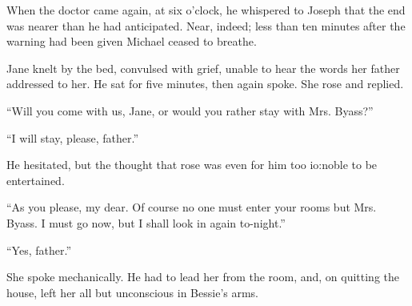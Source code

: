 When the doctor came again, at six o'clock, he whispered to Joseph that
the end was nearer than he had anticipated. Near, indeed; less than ten
minutes after the warning had been given Michael ceased to breathe.

Jane knelt by the bed, convulsed with grief, unable to hear the words
her father addressed to her. He sat for five minutes, then again spoke.
She rose and replied.

``Will you come with us, Jane, or would you rather stay with Mrs.
Byass?''

``I will stay, please, father.''

He hesitated, but the thought that rose was even for him too io:noble to
be entertained.

``As you please, my dear. Of course no one must enter your rooms but
Mrs. Byass. I must go now, but I shall look in again to-night.''

``Yes, father.''

She spoke mechanically. He had to lead her from the room, and, on
quitting the house, left her all but unconscious in Bessie's arms.

